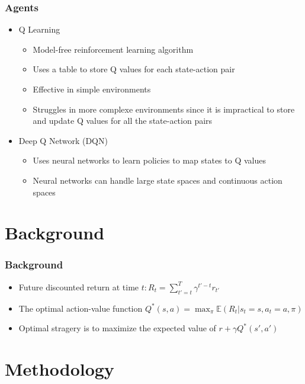 \documentclass{beamer}
\newcommand{\e}[1]{\mathbb{E}(#1)}
\begin{document}
\begin{frame}
    \frametitle{Agents}
    \begin{itemize}
        \item Q Learning \pause
              \begin{itemize}
                  \item Model-free reinforcement learning algorithm \pause
                  \item Uses a table to store Q values for each state-action pair \pause
                  \item Effective in simple environments\pause
                  \item Struggles in more complexe environments since it is impractical to store and
                        update Q values for all the state-action pairs\pause
              \end{itemize}
        \item Deep Q Network (DQN) \pause
              \begin{itemize}
                  \item Uses neural networks to learn policies to map states to Q values\pause
                  \item Neural networks can handle large state spaces and continuous action spaces
              \end{itemize}
    \end{itemize}
\end{frame}

\section{Background}
\begin{frame}
    \frametitle{Background}
    \begin{itemize}
        \item Future discounted return at time \(t: R_t =
              \sum_{t'=t}^{T}\gamma^{t'-t}r_{t'}\) \pause
        \item The optimal action-value function \(Q^*(s,a) = \max_\pi \e{R_t | s_t = s, a_t =
                  a, \pi}\) \pause
        \item Optimal stragery is to maximize the expected value of \(r + \gamma Q^*(s',a')\)
    \end{itemize}

\end{frame}

\section{Methodology}
\end{document}
